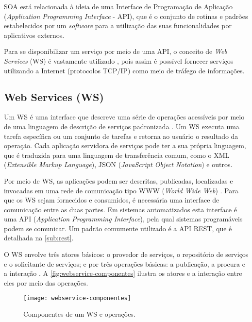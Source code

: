 SOA está relacionada à ideia de uma Interface de Programação de Aplicação (\textit{Application Programming Interface} - API), que é o conjunto de rotinas e padrões estabelecidos por um \textit{software} para a utilização das suas funcionalidades por aplicativos externos.

Para se disponibilizar um serviço por meio de uma API, o conceito de \textit{Web Services} (WS) é vastamente utilizado \cite{souit2013soa}, pois assim é possível fornecer serviços utilizando a Internet (protocolos TCP/IP) como meio de tráfego de informações.

\subsection{Web Services (WS)}
\label{sub:web-services}

Um WS é uma interface que descreve uma série de operações acessíveis por meio de uma linguagem de descrição de serviços padronizada \cite{gottschalk2002webservices}. Um WS executa uma tarefa específica ou um conjunto de tarefas e retorna ao usuário o resultado da operação. Cada aplicação servidora de serviços pode ter a sua própria linguagem, que é traduzida para uma linguagem de transferência comum, como o XML (\textit{Extensible Markup Language}), JSON (\textit{JavaScript Object Notation}) e outros.

Por meio de WS, as aplicações podem ser descritas, publicadas, localizadas e invocadas em uma rede de comunicação tipo WWW (\textit{World Wide Web}) \cite{souit2013soa}. Para que os WS sejam fornecidos e consumidos, é necessária uma interface de comunicação entre as duas partes. Em sistemas automatizados esta interface é uma API (\textit{Application Programming Interface}), pela qual sistemas programáveis podem se comunicar. Um padrão comumente utilizado é a API REST, que é detalhada na \autoref{sub:rest}.

O WS envolve três atores básicos: o provedor de serviços, o repositório de serviços e o solicitante de serviços; e por três operações básicas: a publicação, a procura e a interação \cite{gottschalk2002webservices}. A \autoref{fig:webservice-componentes} ilustra os atores e a interação entre eles por meio das operações.

\begin{figure}[htb]
	\centering
	\texttt{[image: webservice-componentes]}
	\caption{Componentes de um WS e operações.}
	\label{fig:webservice-componentes}
\end{figure}

